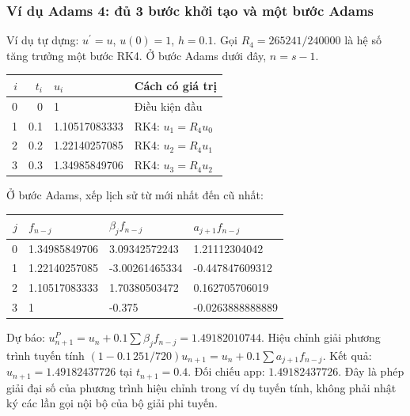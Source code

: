 \subsubsection*{Ví dụ Adams 4: đủ 3 bước khởi tạo và một bước Adams}
Ví dụ tự dựng: $u^{\prime}=u$, $u(0)=1$, $h=0.1$. Gọi $R_4=265241/240000$ là hệ số tăng trưởng một bước RK4. Ở bước Adams dưới đây, $n=s-1$.
\begin{center}\begin{tabular}{rrll}\toprule $i$&$t_i$&$u_i$&Cách có giá trị\\\midrule
0&0&1&Điều kiện đầu\\
1&0.1&1.10517083333&RK4: $u_1 = R_4u_{0}$\\
2&0.2&1.22140257085&RK4: $u_2 = R_4u_{1}$\\
3&0.3&1.34985849706&RK4: $u_3 = R_4u_{2}$\\
\bottomrule\end{tabular}\end{center}
Ở bước Adams, xếp lịch sử từ mới nhất đến cũ nhất:
\begin{center}\begin{tabular}{rlll}\toprule $j$&$f_{n-j}$&$\beta_jf_{n-j}$&$a_{j+1}f_{n-j}$\\\midrule
0&1.34985849706&3.09342572243&1.21112304042\\
1&1.22140257085&-3.00261465334&-0.447847609312\\
2&1.10517083333&1.70380503472&0.162705706019\\
3&1&-0.375&-0.0263888888889\\
\bottomrule\end{tabular}\end{center}
Dự báo: $u_{n+1}^P=u_n+0.1\sum\beta_jf_{n-j}=1.49182010744$.
Hiệu chỉnh giải phương trình tuyến tính $(1-0.1\,251/720)u_{n+1}=u_n+0.1\sum a_{j+1}f_{n-j}$.
Kết quả: $u_{n+1}=1.49182437726$ tại $t_{n+1}=0.4$. Đối chiếu app: $1.49182437726$.
Đây là phép giải đại số của phương trình hiệu chỉnh trong ví dụ tuyến tính, không phải nhật ký các lần gọi nội bộ của bộ giải phi tuyến.
\examplebreak
